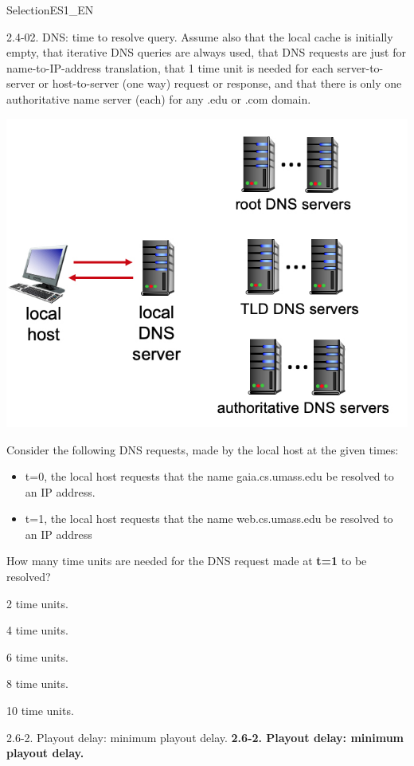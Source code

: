 \documentclass[a4paper]{article}
\begin{document}
\begin{quiz}{SelectionES1\_EN}
\begin{multi}[points=1,shuffle]{2.4-02. DNS: time to resolve query.}
Assume also that the local cache is initially empty, that iterative DNS queries are always used, that DNS requests are just for name-to-IP-address translation, that 1 time unit is needed for each server-to-server or host-to-server (one way) request or response, and that there is only one authoritative name server (each) for any .edu or .com domain. 
\begin{center}
\includegraphics[width=\linewidth]{figs/2.4.4.jpg}
\end{center}

Consider the following DNS requests, made by the local host at the given times:
\begin{itemize}
	\item t=0, the local host requests that the name gaia.cs.umass.edu be resolved to an IP address. 
	\item t=1, the local host requests that the name web.cs.umass.edu be resolved to an IP address
\end{itemize}

How many time units are needed for the DNS request made at \textbf{t=1} to be resolved?
\item 2 time units.
\item 4 time units.
\item 6 time units.
\item 8 time units.
\item* 10 time units.
\end{multi}

\begin{multi}[points=1,shuffle]{2.6-2. Playout delay: minimum playout delay.}
\textbf{2.6-2. Playout delay: minimum playout delay.}


\end{multi}
\end{quiz}
\end{document}
